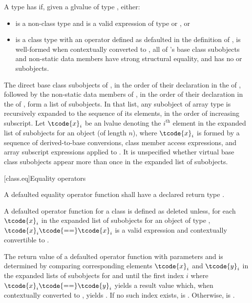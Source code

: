 \pnum
{}%
A type  has  if,
given a glvalue  of type , either:
\begin{itemize}
\item
   is a non-class type and  is a valid expression
  of type  or , or
\item
   is a class type with an \tcode{==} operator
  defined as defaulted in the definition of ,
   is well-formed when contextually converted to ,
  all of 's base class subobjects and non-static data members
  have strong structural equality, and
   has no  or  subobjects.
\end{itemize}

\pnum
The direct base class subobjects of ,
in the order of their declaration in the  of ,
followed by the non-static data members of ,
in the order of their declaration in the  of ,
form a list of subobjects.
In that list, any subobject of array type is recursively expanded
to the sequence of its elements, in the order of increasing subscript.
Let $\tcode{x}_i$ be an lvalue denoting the $i^\text{th}$ element
in the expanded list of subobjects for an object 
(of length $n$),
where $\tcode{x}_i$ is
formed by a sequence of
derived-to-base conversions,
class member access expressions, and
array subscript expressions applied to .
It is unspecified whether virtual base class subobjects
appear more than once in the expanded list of subobjects.

[class.eq]{Equality operators}
%
%

\pnum
A defaulted equality operator function
shall have a declared return type .

\pnum
A defaulted \tcode{==} operator function for a class 
is defined as deleted
unless, for each $\tcode{x}_i$ in the expanded list of subobjects
for an object  of type ,
$\tcode{x}_i\tcode{ == }\tcode{x}_i$ is a valid expression and
contextually convertible to .

\pnum
The return value  of a defaulted \tcode{==} operator function
with parameters  and  is determined
by comparing corresponding elements $\tcode{x}_i$ and $\tcode{y}_i$
in the expanded lists of subobjects for  and 
until the first index $i$
where $\tcode{x}_i\tcode{ == }\tcode{y}_i$ yields a result value which,
when contextually converted to , yields .
If no such index exists,  is .
Otherwise,  is .

